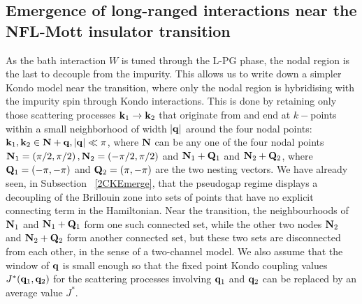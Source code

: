 \documentclass[reprint,hidelinks,onecolumn]{revtex4-2}
\begin{document}
\subsection{Emergence of long-ranged interactions near the NFL-Mott insulator transition}
As the bath interaction \(W\) is tuned through the L-PG phase, the nodal region is the last to decouple from the impurity. This allows us to write down a simpler Kondo model near the transition, where only the nodal region is hybridising with the impurity spin through Kondo interactions. This is done by retaining only those scattering processes \({\bf k}_1 \to {\bf k}_2\) that originate from and end at \(k-\)points within a small neighborhood of width \(|{\bf q}|\) around the four nodal points: \({\bf k}_1, {\bf k}_2 \in {\bf N} + {\bf q}, |{\bf q}| \ll \pi\), where \({\bf N}\) can be any one of the four nodal points \({\bf N}_{1} = \left(\pi/2, \pi/2\right), {\bf N}_{2} = \left(-\pi/2, \pi/2\right)\) and \({\bf N}_1 + {\bf Q}_1\) and \({\bf N}_{2} + {\bf Q}_2\), where \({\bf Q}_1 = \left(-\pi,-\pi \right)\) and \({\bf Q}_2 = \left( \pi, -\pi \right) \) are the two nesting vectors. We have already seen, in Subsection ~\ref{2CKEmerge}, that the pseudogap regime displays a decoupling of the Brillouin zone into sets of points that have no explicit connecting term in the Hamiltonian. Near the transition, the neighbourhoods of \({\bf N}_{1}\) and \({\bf N}_{1} + {\bf Q}_1\) form one such connected set, while the other two nodes \({\bf N}_{2}\) and \({\bf N}_{2} + {\bf Q}_2\) form another connected set, but these two sets are disconnected from each other, in the sense of a two-channel model. We also assume that the window of \({\bf q}\) is small enough so that the fixed point Kondo coupling values \(J^*({\bf q}_1, {\bf q}_2)\) for the scattering processes involving \({\bf q}_1\) and \({\bf q}_2\) can be replaced by an average value \(J^*\).
\end{document}
